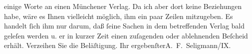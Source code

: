 \begin{ledgroupsized}[t]{13cm}
                    einige Worte an einen Münchener Verlag. Da
                    ich aber dort keine Beziehungen habe, wäre es Ihnen vielleicht möglich, ihm ein
                        {\pb}paar Zeilen mitzugeben. Es
                    handelt ſich ihm nur darum, daß ſeine Sachen in dem betreffenden Verlag bald
                    geleſen werden u. er in kurzer Zeit einen zuſagenden oder ablehnenden Beſcheid
                    erhält. Verzeihen Sie die Beläſtigung.\pend
           \pstart Ihr ergebenſter\spacefill\mbox{A. F. Seligmann}\pend{}/IX.\pend
           \endnumbering{}\end{ledgroupsized}  \newcommand{\dateiname}{L01236}\newcommand{\titel}{Adalbert Seligmann an Arthur Schnitzler, 30. 9. [1902?]}\newcommand{\editorInnen}{Martin Anton Müller und Gerd-Hermann Susen}
      